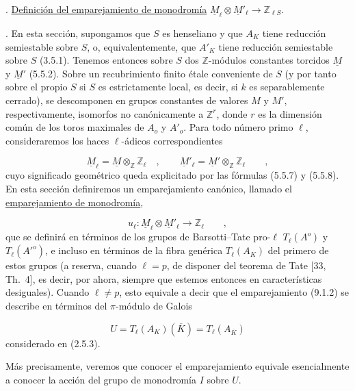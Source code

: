 
\medskip
{}. \underline{Definición del emparejamiento de monodromía}
$\underline{M}_{\ell}\otimes\underline{M}'_{\ell}
 \longrightarrow \mathbb{Z}_{\ell S}$.

\medskip
{}. En esta sección, supongamos que $S$ es henseliano y que $A_K$
tiene reducción semiestable sobre $S$, o, equivalentemente, que $A'_K$
tiene reducción semiestable sobre $S$ (3.5.1). Tenemos entonces sobre
$S$ dos $\mathbb{Z}$-módulos constantes torcidos $\underline{M}$ y
$\underline{M}'$ (5.5.2). Sobre un recubrimiento finito étale
conveniente de $S$ (y por tanto sobre el propio $S$ si $S$ es
estrictamente local, es decir, si $k$ es separablemente cerrado), se
descomponen en grupos constantes de valores $M$ y $M'$,
respectivamente, isomorfos no canónicamente a $\mathbb{Z}^{r}$, donde
$r$ es la dimensión común de los toros maximales de $A_o$ y $A'_o$.
Para todo número primo $\ell$, consideraremos los haces $\ell$-ádicos
correspondientes

\begin{equation}\tag{9.1.1}
\underline{M}_{\ell}=\underline{M}\otimes_{\mathbb{Z}}\mathbb{Z}_{\ell}
 \quad , \qquad
\underline{M}'_{\ell}=\underline{M}'\otimes_{\mathbb{Z}}\mathbb{Z}_{\ell}
 \qquad ,
\end{equation}
cuyo significado geométrico queda explicitado por las fórmulas (5.5.7)
y (5.5.8). En esta sección definiremos un emparejamiento canónico,
llamado el \underline{emparejamiento de monodromía},

\begin{equation}\tag{9.1.2}
u_{\ell}:\underline{M}_{\ell}\otimes\underline{M}'_{\ell}
 \longrightarrow\mathbb{Z}_{\ell} \qquad ,
\end{equation}
que se definirá en términos de los grupos de Barsotti--Tate
pro-$\ell$ $T_{\ell}(A^{o})$ y $T_{\ell}({A'}^{o})$, e incluso en
términos de la fibra genérica $T_{\ell}(A_K)$ del primero de estos
grupos (a reserva, cuando $\ell=p$, de disponer del teorema de Tate
[33, Th.~4], es decir, por ahora, siempre que estemos entonces en
características desiguales). Cuando $\ell\neq p$, esto equivale a decir
que el emparejamiento (9.1.2) se describe en términos del
$\pi$-módulo de Galois

\begin{equation}\tag{9.1.3}
U=T_{\ell}(A_K)(\overline K)=T_{\ell}(A_{\overline K})
\end{equation}
considerado en (2.5.3).


Más precisamente, veremos que conocer el emparejamiento equivale
esencialmente a conocer la acción del grupo de monodromía $I$ sobre
$U$.
